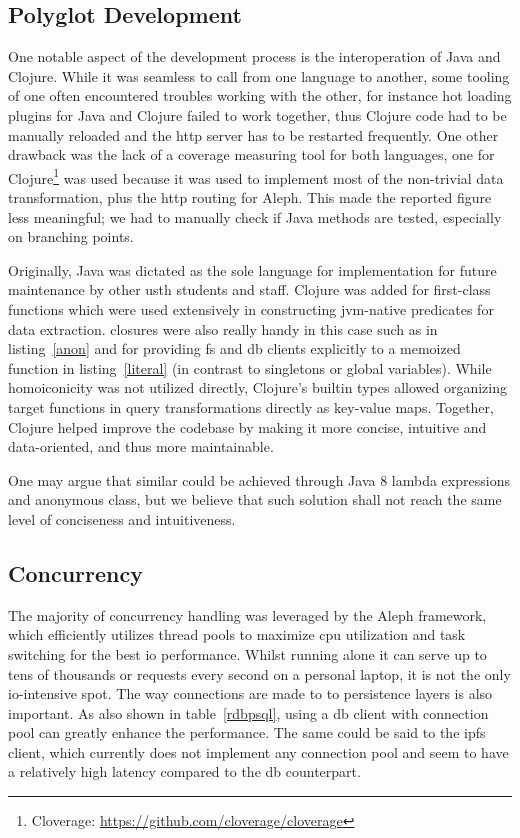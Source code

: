 \subsection{Polyglot Development}
One notable aspect of the development process is the interoperation of Java
and Clojure.  While it was seamless to call from one language to another,
some tooling of one often encountered troubles working with the other,
for instance hot loading plugins for Java and Clojure failed to work together,
thus Clojure code had to be manually reloaded and the \gls{http} server
has to be restarted frequently.  One other drawback was the lack of a coverage
measuring tool for both languages, one for Clojure\footnote{Cloverage:
\url{https://github.com/cloverage/cloverage}} was used because it was used
to implement most of the non-trivial data transformation, plus the \gls{http}
routing for Aleph.  This made the reported figure less meaningful; we had
to manually check if Java methods are tested, especially on branching points.

Originally, Java was dictated as the sole language for implementation
for future maintenance by other \gls{usth} students and staff.  Clojure
was added for first-class functions which were used extensively in constructing
\gls{jvm}-native predicates for data extraction.  \Glspl{closure} were also
really handy in this case such as in listing~\ref{anon} and for providing
\gls{fs} and \gls{db} clients explicitly to a memoized function
in listing~\ref{literal} (in contrast to singletons or global variables).
While \gls{homoiconicity} was not utilized directly, Clojure's builtin types
allowed organizing target functions in query transformations directly
as key-value maps.  Together, Clojure helped improve the codebase by making it
more concise, intuitive and data-oriented, and thus more maintainable.

One may argue that similar could be achieved through Java 8 lambda expressions
and anonymous class, but we believe that such solution shall not reach
the same level of conciseness and intuitiveness.

\subsection{Concurrency}
The majority of concurrency handling was leveraged by the Aleph framework,
which efficiently utilizes thread pools to maximize \gls{cpu} utilization and
task switching for the best \gls{io} performance.  Whilst running alone it can
serve up to tens of thousands or requests every second on a personal laptop,
it is not the only \gls{io}-intensive spot.  The way connections are made to
to persistence layers is also important.  As also shown in table~\ref{rdbpsql},
using a \gls{db} client with connection pool can greatly enhance
the performance.  The same could be said to the \gls{ipfs} client,
which currently does not implement any connection pool and seem to have
a relatively high latency compared to the \gls{db} counterpart.

